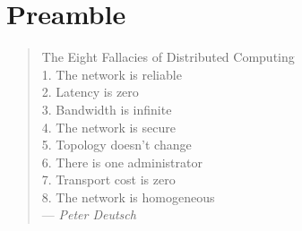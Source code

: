 \chapter{Preamble}
\begin{quote}
The Eight Fallacies of Distributed Computing\\
 1. The network is reliable\\
 2. Latency is zero\\
 3. Bandwidth is infinite\\
 4. The network is secure\\
 5. Topology doesn't change\\
 6. There is one administrator\\
 7. Transport cost is zero\\
 8. The network is homogeneous\\
--- \emph{Peter Deutsch}
\end{quote}


